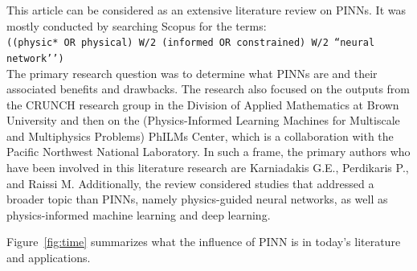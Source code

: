 \documentclass[pdflatex,sn-basic]{sn-jnl}%
\theoremstyle{thmstyleone}%
\theoremstyle{thmstyletwo}%
\theoremstyle{thmstylethree}%
\newcommand{\code}[1]{\colorbox{light-gray}{\texttt{#1}}}
\begin{document}
This article can be considered as an extensive literature review on PINNs.
%
It was mostly conducted by searching Scopus for the terms:
\\
\noindent
\texttt{((physic* OR physical) W/2 (informed OR constrained) W/2 ``neural network’’)
}
\\
\noindent
%
%
The primary research question was to determine what PINNs are and their associated benefits and drawbacks.
The research also focused on the outputs from the CRUNCH research group in the Division of Applied Mathematics at Brown University and then on the (Physics-Informed Learning Machines for Multiscale and Multiphysics Problems) PhILMs Center, which is a collaboration with the Pacific Northwest National Laboratory.
In such a frame, the primary authors who have been involved in this literature research are Karniadakis G.E., Perdikaris P., and Raissi M.
Additionally, the review considered studies that addressed a broader topic than PINNs, namely physics-guided neural networks, as well as physics-informed machine learning and deep learning.



Figure~\ref{fig:time} summarizes what the influence of PINN is in today's literature and applications. 
\end{document}
